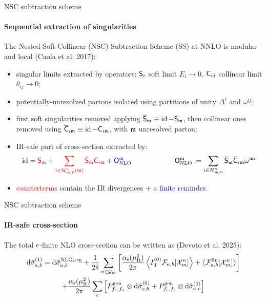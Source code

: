 
\begin{frame}{NSC subtraction scheme}
  \framesubtitle{Sequential extraction of singularities}

  \justifying
  The Nested Soft-Collinear (NSC) Subtraction Scheme (SS) at NNLO is modular and local (Caola et al. 2017):
  \begin{itemize}[<+->]
    \item singular limits extracted by operators: $ \mathsf{S}_i $ soft limit $ E_i \rightarrow 0 $, $ \mathsf{C}_{ij} $ collinear limit $ \theta_{ij} \rightarrow 0 $;
    \item potentially-unresolved partons isolated using partitions of unity $ \Delta^i $ and $ \omega^{ij} $;
    \item first soft singularities removed applying $ \overline{\mathsf{S}}_{\mathfrak{m}} \equiv \operatorname{id} - \mathsf{S}_{\mathfrak{m}} $, then collinear ones removed using $ \overline{\mathsf{C}}_{i\mathfrak{m}} \equiv \operatorname{id} - \mathsf{C}_{i\mathfrak{m}} $, with $ \mathfrak{m} $ unresolved parton;
    \item IR-safe part of cross-section extracted by:
      \begin{equation*}
        \id = \textcolor{red}{\so_\ur} + \textcolor{red}{\sum_{i \in \prt{n}{m}(\ur)} \oso_\ur \co_{i\ur}} + \textcolor{blue}{\nlo^\ur}
        \qquad \qquad \qquad
        \nlo^\ur \defeq \sum_{i \in \prt{n}{m}} \oso_\ur \oco_{i\ur} \omega^{\ur i}
      \end{equation*}
    \item \textcolor{red}{counterterms} contain the IR divergences + a \textcolor{blue}{finite reminder}.
  \end{itemize}

\end{frame}


\begin{frame}{NSC subtraction scheme}
  \framesubtitle{IR-safe cross-section}

  The total $ \epsilon $-finite NLO cross-section can be written as (Devoto et al. 2025):
  \begin{multline*}
    \mathrm{d}\hat{\sigma}_{a,b}^{(1)} = \mathrm{d}\hat{\sigma}_{a,b}^\text{NLO,reg} + \frac{1}{2\hat{s}} \sum_{n \in \mathcal{G}_m} \left[ \frac{\alpha_\text{s}(\mu_\text{R}^2)}{2\pi} \left\langle I_\text{T}^{(0)} \mathcal{F}_{a,b}[\mathcal{X}^{n}_{m}] \right\rangle + \left\langle \mathcal{F}_{a,b}^\text{fin}[\mathcal{X}^{n}_{m}] \right\rangle \right] \\
    + \frac{\alpha_\text{s}(\mu_\text{R}^2)}{2\pi} \sum_c \left[ P^\text{gen}_{f_c , f_a} \otimes \mathrm{d}\hat{\sigma}^{(0)}_{c,b} + P^\text{gen}_{f_c , f_b} \otimes \mathrm{d}\hat{\sigma}^{(0)}_{a,c} \right]
  \end{multline*}

  \vspace{6.41em}

\end{frame}


